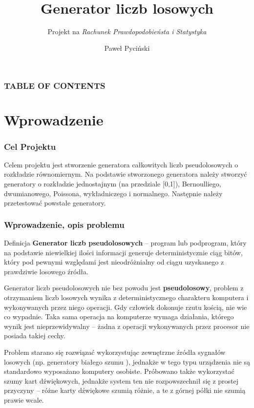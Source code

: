 \documentclass[9pt]{beamer}
\title{Generator liczb losowych}
\subtitle{Projekt na \textit{Rachunek Prawdopodobieństa i Statystyka}}
\author{Paweł Pyciński}
\institute{Uniwersytet Jagielloński}
\begin{document}
\titlepage

\begin{frame}

 \frametitle{TABLE OF CONTENTS}
 \tableofcontents
\end{frame}

\section{Wprowadzenie}
\begin{frame}
  \frametitle{Cel Projektu}
  Celem projektu jest stworzenie generatora całkowitych liczb pseudolosowych o rozkładzie równomiernym. Na podstawie stworzonego generatora należy stworzyć generatory o rozkładzie jednostajnym (na przedziale [0,1]), Bernoulliego, dwumianowego, Poissona, wykładniczego i normalnego. Następnie należy przetestować powstałe generatory.
\end{frame}
\begin{frame}
  \frametitle{Wprowadzenie, opis problemu}
  \begin{block}{Definicja}
    \textbf{Generator liczb pseudolosowych} – program lub podprogram, który na podstawie niewielkiej ilości informacji generuje deterministycznie ciąg bitów, który pod pewnymi względami jest nieodróżnialny od ciągu uzyskanego z prawdziwie losowego źródła.
    \end{block}

  Generator liczb pseudolosowych nie bez powodu jest \textbf{pseudolosowy}, problem z otrzymaniem liczb losowych wynika z deterministycznego charakteru komputera i wykonywanych przez niego operacji. Gdy człowiek dokonuje rzutu kością, nie wie co wypadnie. Taka sama operacja na komputerze wymaga działania, którego wynik jest nieprzewidywalny – żadna z operacji wykonywanych przez procesor nie posiada takiej cechy.

  Problem starano się rozwiązać wykorzystując zewnętrzne źródła sygnałów losowych (np. generatory białego szumu ), jednakże w tego typu urządzenia nie są standardowo wyposażano komputery osobiste. Próbowano także wykorzystać szumy kart dźwiękowych, jednakże system ten nie rozpowszechnił się z prostej przyczyny – różne karty dźwiękowe szumią różnie, a te z górnej półki nie szumią prawie wcale.
\end{frame}
\end{document}
